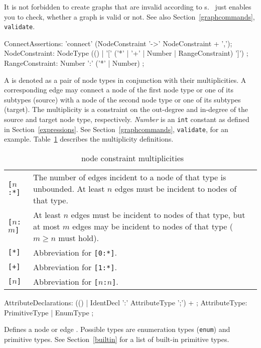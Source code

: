 \begin{note}
It is not forbidden to create graphs that are invalid according to s. \GrG\ just enables you to check, whether a graph is valid or not. See also Section~\ref{graphcommands}, \texttt{validate}.
\end{note}

\begin{rail}  
  ConnectAssertions: 'connect' (NodeConstraint '->' NodeConstraint + ',');
  NodeConstraint: NodeType (() | '[' ('*' | '+' | Number | RangeConstraint) ']') ;
  RangeConstraint: Number ':' ('*' | Number) ;
\end{rail}
A  is denoted as a pair of node types in conjunction with their multiplicities. A corresponding edge may connect a node of the first node type or one of its subtypes (source) with a node of the second node type or one of its subtypes (target). The multiplicity is a constraint on the out-degree and in-degree of the source and target node type, respectively. \emph{Number} is an \texttt{int} constant as defined in Section~\ref{expressions}. See Section~\ref{graphcommands}, \texttt{validate}, for an example. Table~\ref{multiplicities} describes the multiplicity definitions.
\begin{table}[htbp]
\begin{tabularx}{\linewidth}{|l|X|}\hline
	\texttt{[$n$:*]} & The number of edges incident to a node of that type is unbounded. At least $n$ edges must be incident to nodes of that type.\\ 
	\texttt{[$n$:$m$]} & At least $n$ edges must be incident to nodes of that type, but at most $m$ edges may be incident to nodes of that type ($m \geq n$ must hold).\\
	\texttt{[*]} & Abbreviation for \texttt{[0:*]}.\\
	\texttt{[+]} & Abbreviation for \texttt{[1:*]}.\\
	\texttt{[$n$]} & Abbreviation for \texttt{[$n$:$n$]}. \\ \hline
\end{tabularx}
\caption{\GrG\ node constraint multiplicities}
\label{multiplicities}
\end{table}

\begin{rail}    
  AttributeDeclarations: (() | IdentDecl ':' AttributeType ';') + ;
  AttributeType: PrimitiveType | EnumType ; 
\end{rail}
Defines a node or edge . Possible types are enumeration types (\texttt{enum}) and primitive types. See Section~\ref{builtin} for a list of built-in primitive types.



